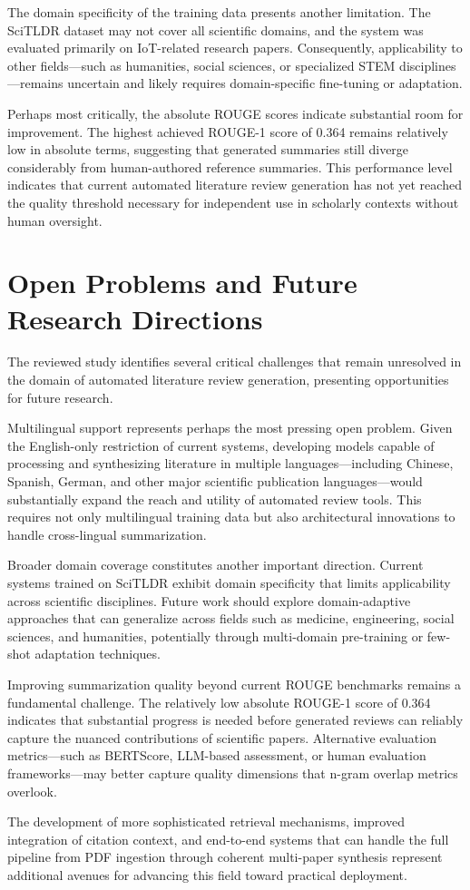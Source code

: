 \documentclass{article}
\begin{document}
The domain specificity of the training data presents another limitation. The SciTLDR dataset may not cover all scientific domains, and the system was evaluated primarily on IoT-related research papers. Consequently, applicability to other fields—such as humanities, social sciences, or specialized STEM disciplines—remains uncertain and likely requires domain-specific fine-tuning or adaptation.

Perhaps most critically, the absolute ROUGE scores indicate substantial room for improvement. The highest achieved ROUGE-1 score of 0.364 remains relatively low in absolute terms, suggesting that generated summaries still diverge considerably from human-authored reference summaries. This performance level indicates that current automated literature review generation has not yet reached the quality threshold necessary for independent use in scholarly contexts without human oversight.

\section{Open Problems and Future Research Directions}
The reviewed study identifies several critical challenges that remain unresolved in the domain of automated literature review generation, presenting opportunities for future research.

Multilingual support represents perhaps the most pressing open problem. Given the English-only restriction of current systems, developing models capable of processing and synthesizing literature in multiple languages—including Chinese, Spanish, German, and other major scientific publication languages—would substantially expand the reach and utility of automated review tools. This requires not only multilingual training data but also architectural innovations to handle cross-lingual summarization.

Broader domain coverage constitutes another important direction. Current systems trained on SciTLDR exhibit domain specificity that limits applicability across scientific disciplines. Future work should explore domain-adaptive approaches that can generalize across fields such as medicine, engineering, social sciences, and humanities, potentially through multi-domain pre-training or few-shot adaptation techniques.

Improving summarization quality beyond current ROUGE benchmarks remains a fundamental challenge. The relatively low absolute ROUGE-1 score of 0.364 indicates that substantial progress is needed before generated reviews can reliably capture the nuanced contributions of scientific papers. Alternative evaluation metrics—such as BERTScore, LLM-based assessment, or human evaluation frameworks—may better capture quality dimensions that n-gram overlap metrics overlook.

The development of more sophisticated retrieval mechanisms, improved integration of citation context, and end-to-end systems that can handle the full pipeline from PDF ingestion through coherent multi-paper synthesis represent additional avenues for advancing this field toward practical deployment.
\end{document}
